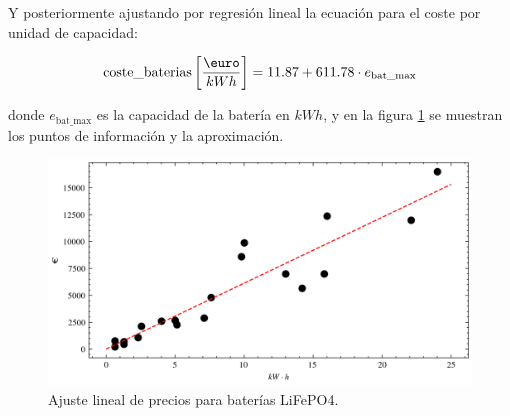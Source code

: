 Y posteriormente ajustando por regresión lineal la ecuación para el coste por
unidad de capacidad:

\begin{equation} \label{eq:battery_cost}
	\text{coste\_baterias} \left[\frac{\text{\euro}}{kWh}\right] = 11.87 + 611.78 \cdot e_{\text{bat\_max}}
\end{equation}

donde $e_{\text{bat\_max}}$ es la capacidad de la batería en $kWh$, y en la
figura \ref{fig:batteries_regression} se muestran los puntos de información y
la aproximación.

\begin{figure}[h] \centering
	\centering
	\includegraphics[width=1\textwidth]{./capitulos/adquisicion_de_datos/images/batteries_regression.png}
	\caption{Ajuste lineal de precios para baterías LiFePO4.}
	\label{fig:batteries_regression}
\end{figure}
